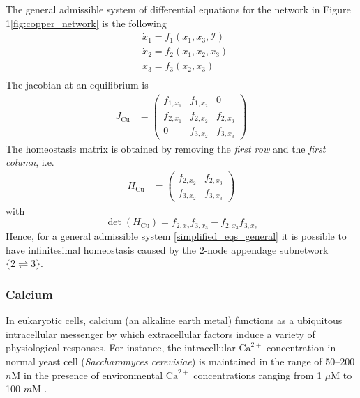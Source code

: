 \documentclass[a4paper,fleqn]{cas-dc}
\newcommand{\II}{{\mathcal I}}
\begin{document}
The general admissible system of differential equations for the network in Figure 1\ref{fig:copper_network}  is the following
\begin{equation} \label{simplified_eqs_general}
\begin{aligned}
& \dot{x}_1 = f_1(x_1,x_3,\II) \\
& \dot{x}_2 = f_2(x_1,x_2,x_3) \\
& \dot{x}_3 = f_3(x_2,x_3) \\
\end{aligned}
\end{equation}
The jacobian at an equilibrium is 
\begin{equation}
\begin{aligned}
J_{\mathrm{Cu}} & = \begin{pmatrix}
f_{1,x_1} & f_{1,x_2} & 0 \\
f_{2,x_1} & f_{2,x_2} & f_{2,x_3} \\
0 & f_{3,x_2} & f_{3,x_3} 
\end{pmatrix} 
\end{aligned}
\end{equation} 
The homeostasis matrix is obtained by removing the \emph{first row} and the \emph{first column}, i.e.
\begin{equation}
\begin{aligned}
H_{\mathrm{Cu}} & = \begin{pmatrix}
f_{2,x_2} & f_{2,x_3} \\
f_{3,x_2} & f_{3,x_3} 
\end{pmatrix} 
\end{aligned}
\end{equation} 
with
\begin{equation}
\det(H_{\mathrm{Cu}}) = f_{2,x_2} f_{3,x_3}
- f_{2,x_3} f_{3,x_2}
\end{equation} 
Hence, for a general admissible system  \eqref{simplified_eqs_general} it is possible to have infinitesimal homeostasis caused by the $2$-node appendage subnetwork $\{2 \rightleftharpoons 3\}$.

\subsubsection{Calcium}

In eukaryotic cells, calcium (an alkaline earth metal) functions as a ubiquitous intracellular messenger by which extracellular factors induce a variety of physiological responses.
For instance, the intracellular $\mathrm{Ca}^{2+}$ concentration in normal yeast cell (\emph{Saccharomyces cerevisiae}) is maintained in the range of 50–200 $n$M in the presence of environmental $\mathrm{Ca}^{2+}$ concentrations ranging from 1 $\mu$M to 100 $m$M \cite{miseta1999}. 
\end{document}
